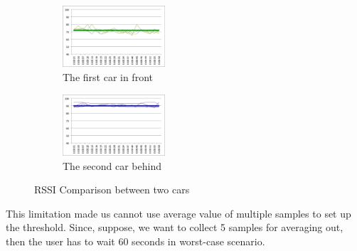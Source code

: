 \begin{figure}
	\centering
	\begin{subfigure}[b]{.5\linewidth}
		\centering
		\includegraphics[width=1.5in]{figure/bt_first_car}
		\caption{The first car in front}
		\label{fig:first car}
	\end{subfigure}%
	\begin{subfigure}[b]{.5\linewidth}
		\centering
		\includegraphics[width=1.5in]{figure/bt_second_car}
		\caption{The second car behind}
		\label{fig:second car}
	\end{subfigure}
	\caption{RSSI Comparison between two cars}
	\label{fig:comparison}
\end{figure}

This limitation made us cannot use average value of multiple samples to set up the threshold. Since, suppose, we want to collect 5 samples for averaging out, then the user has to wait 60 seconds in worst-case scenario.
